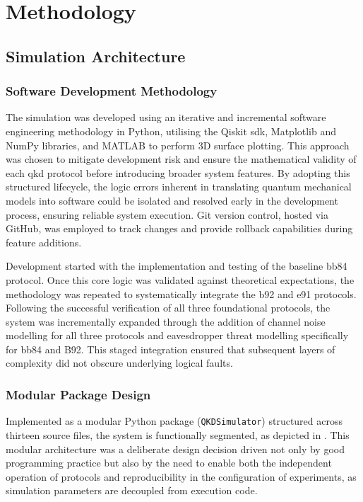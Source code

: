 \chapter{Methodology}
\section{Simulation Architecture}
\label{sec:simarch}

\subsection{Software Development Methodology}
\label{subsec:dev}

The simulation was developed using an iterative and incremental software engineering methodology in Python, utilising the Qiskit \gls{sdk}, Matplotlib and NumPy libraries, and MATLAB to perform 3D surface plotting. This approach was chosen to mitigate development risk and ensure the mathematical validity of each \gls{qkd} protocol before introducing broader system features. By adopting this structured lifecycle, the logic errors inherent in translating quantum mechanical models into software could be isolated and resolved early in the development process, ensuring reliable system execution. Git version control, hosted via GitHub, was employed to track changes and provide rollback capabilities during feature additions.

Development started with the implementation and testing of the baseline \gls{bb84} protocol. Once this core logic was validated against theoretical expectations, the methodology was repeated to systematically integrate the \gls{b92} and \gls{e91} protocols. Following the successful verification of all three foundational protocols, the system was incrementally expanded through the addition of channel noise modelling for all three protocols and eavesdropper threat modelling specifically for \gls{bb84} and B92. This staged integration ensured that subsequent layers of complexity did not obscure underlying logical faults. 

\subsection{Modular Package Design}
\label{subsec:moddesign}

Implemented as a modular Python package (\texttt{QKDSimulator}) structured across thirteen source files, the system is functionally segmented, as depicted in . This modular architecture was a deliberate design decision driven not only by good programming practice but also by the need to enable both the independent operation of protocols and reproducibility in the configuration of experiments, as simulation parameters are decoupled from execution code.  

